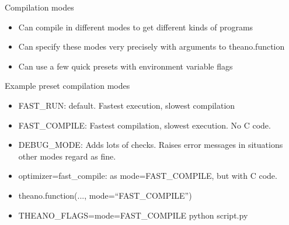 \documentclass[utf8x,xcolor=pdftex,dvipsnames,table]{beamer}
\begin{document}

\begin{frame}{Compilation modes}
  \begin{itemize}
  \item Can compile in different modes to get different kinds of programs
  \item Can specify these modes very precisely with arguments to theano.function
  \item Can use a few quick presets with environment variable flags
  \end{itemize}
\end{frame}

\begin{frame}{Example preset compilation modes}
  \begin{itemize}
  \item FAST\_RUN: default. Fastest execution, slowest compilation
  \item FAST\_COMPILE: Fastest compilation, slowest execution. No C code.
  \item DEBUG\_MODE: Adds lots of checks.
Raises error messages in situations other
modes regard as fine.
  \item optimizer=fast\_compile: as mode=FAST\_COMPILE, but with C code.
  \item theano.function(..., mode=``FAST\_COMPILE'')
  \item THEANO\_FLAGS=mode=FAST\_COMPILE python script.py
  \end{itemize}
\end{frame}
\end{document}
